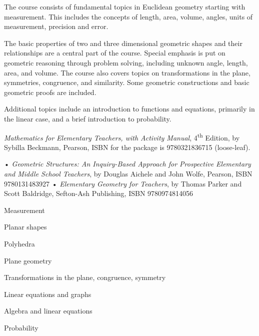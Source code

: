 \documentclass{osucourse}
\begin{document}
\CatalogDescription
\PrerequisitesAndExclusions

\begin{Purpose}
The course consists of fundamental topics in Euclidean geometry starting with measurement. This includes the concepts of length, area, volume, angles, units of measurement, precision and error.

The basic properties of two and three dimensional geometric shapes and their relationships are a central part of the course. Special emphasis is put on geometric reasoning through problem solving, including unknown angle, length, area, and volume. The course also covers topics on transformations in the plane, symmetries, congruence, and similarity. Some geometric constructions and basic geometric proofs are included.

Additional topics include an introduction to functions and equations, primarily in the linear case, and a brief introduction to probability.
\end{Purpose}

\begin{Text}
\emph{Mathematics for Elementary Teachers, with Activity Manual}, 4\textsuperscript{th} Edition, by Sybilla Beckmann, Pearson, ISBN for the package is 9780321836715 (loose-leaf).
\end{Text}

\begin{SupplementalTexts}
• \emph{Geometric Structures: An Inquiry-Based Approach for Prospective Elementary and Middle School Teachers}, by Douglas Aichele and John Wolfe, Pearson, ISBN 9780131483927 • \emph{Elementary Geometry for Teachers}, by Thomas Parker and Scott Baldridge, Sefton-Ash Publishing, ISBN 9780974814056
\end{SupplementalTexts}

\begin{TopicsList}
\item Measurement
\item Planar shapes
\item Polyhedra
\item Plane geometry
\item Transformations in the plane, congruence, symmetry
\item Linear equations and graphs
\item Algebra and linear equations
\item Probability
\end{TopicsList}
\end{document}
